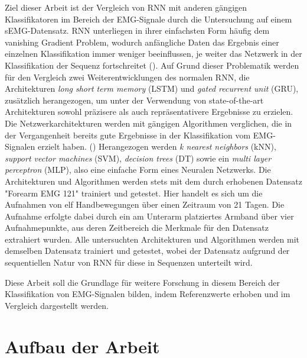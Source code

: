Ziel dieser Arbeit ist der Vergleich von RNN mit anderen gängigen Klassifikatoren im Bereich der EMG-Signale durch die Untersuchung auf einem sEMG-Datensatz. RNN unterliegen in ihrer einfachsten Form häufig dem vanishing Gradient Problem, wodurch anfängliche Daten das Ergebnis einer einzelnen Klassifikation immer weniger beeinflussen, je weiter das Netzwerk in der Klassifikation der Sequenz fortschreitet (\cite{pascanu2013difficulty}). Auf Grund dieser Problematik werden für den Vergleich zwei Weiterentwicklungen des normalen RNN, die Architekturen \textit{long short term memory} (LSTM) und \textit{gated recurrent unit} (GRU), zusätzlich herangezogen, um unter der Verwendung von state-of-the-art Architekturen sowohl präzisere als auch repräsentativere Ergebnisse zu erzielen. Die Netzwerkarchitekturen werden mit gängigen Algorithmen verglichen, die in der Vergangenheit bereits gute Ergebnisse in der Klassifikation vom EMG-Signalen erzielt haben. (\cite{Kaufmann2013}) Herangezogen werden \textit{k nearest neighbors} (kNN), \textit{support vector machines} (SVM), \textit{decision trees} (DT) sowie ein \textit{multi layer perceptron} (MLP), also eine einfache Form eines Neuralen Netzwerks.
Die Architekturen und Algorithmen werden stets mit dem durch \cite{Kaufmann2013Data} erhobenen Datensatz "Forearm EMG 121" trainiert und getestet. Hier handelt es sich um die Aufnahmen von elf Handbewegungen über einen Zeitraum von 21 Tagen. Die Aufnahme erfolgte dabei durch ein am Unterarm platziertes Armband über vier Aufnahmepunkte, aus deren Zeitbereich die Merkmale für den Datensatz extrahiert wurden. Alle untersuchten Architekturen und Algorithmen werden mit demselben Datensatz trainiert und getestet, wobei der Datensatz aufgrund der sequentiellen Natur von RNN für diese in Sequenzen unterteilt wird.

Diese Arbeit soll die Grundlage für weitere Forschung in diesem Bereich der Klassifikation von EMG-Signalen bilden, indem Referenzwerte erhoben und im Vergleich dargestellt werden.


\section{Aufbau der Arbeit}
\label{sec:aufbau-der-arbeit}

